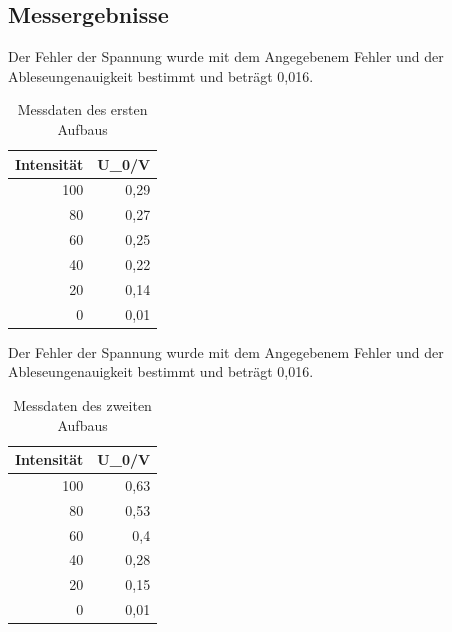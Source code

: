 \documentclass[12pt,a4paper]{article}
\begin{document}
\subsection{Messergebnisse}

Der Fehler der Spannung wurde mit dem Angegebenem Fehler und der Ableseungenauigkeit bestimmt und beträgt 0,016.

\begin{table}[H]
\caption{Messdaten des ersten Aufbaus}
\begin{center}
\begin{tabular}{|r|r|}
\hline
\multicolumn{1}{|l|}{Intensität} & \multicolumn{1}{l|}{U\_0/V} \\ \hline
100 & 0,29 \\ \hline
80 & 0,27 \\ \hline
60 & 0,25 \\ \hline
40 & 0,22 \\ \hline
20 & 0,14 \\ \hline
0 & 0,01 \\ \hline
\end{tabular}
\end{center}
\label{tab:2_8_a}
\end{table}

Der Fehler der Spannung wurde mit dem Angegebenem Fehler und der Ableseungenauigkeit bestimmt und beträgt 0,016.

\begin{table}[H]
\caption{Messdaten des zweiten Aufbaus}
\begin{center}
\begin{tabular}{|r|r|}
\hline
\multicolumn{1}{|l|}{Intensität} & \multicolumn{1}{l|}{U\_0/V} \\ \hline
100 & 0,63 \\ \hline
80 & 0,53 \\ \hline
60 & 0,4 \\ \hline
40 & 0,28 \\ \hline
20 & 0,15 \\ \hline
0 & 0,01 \\ \hline
\end{tabular}
\end{center}
\label{tab:2_8_b}
\end{table}
\end{document}
